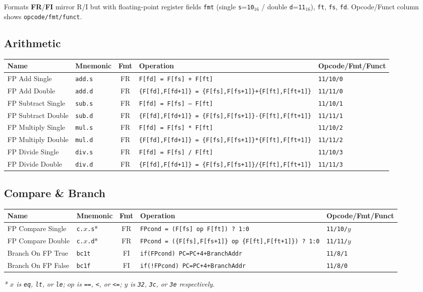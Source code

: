 \documentclass[10pt]{article}
\newcommand{\op}[1]{\texttt{#1}}
\begin{document}
Formats \textbf{FR}/\textbf{FI} mirror R/I but with floating-point register
fields \op{fmt} (single \op{s}=\op{10}$_{16}$ / double \op{d}=\op{11}$_{16}$),
\op{ft}, \op{fs}, \op{fd}. Opcode/Funct column shows \op{opcode/fmt/funct}.

\subsection{Arithmetic}
\begin{center}
\small
\begin{tabular}{@{}p{3.0cm}p{1.3cm}cp{6.4cm}l@{}}
\toprule
Name & Mnemonic & Fmt & Operation & Opcode/Fmt/Funct \\
\midrule
FP Add Single      & \op{add.s} & FR & \op{F[fd] = F[fs] + F[ft]} & \op{11/10/0} \\
FP Add Double       & \op{add.d} & FR & \op{\{F[fd],F[fd+1]\} = \{F[fs],F[fs+1]\}+\{F[ft],F[ft+1]\}} & \op{11/11/0} \\
FP Subtract Single & \op{sub.s} & FR & \op{F[fd] = F[fs] -- F[ft]} & \op{11/10/1} \\
FP Subtract Double  & \op{sub.d} & FR & \op{\{F[fd],F[fd+1]\} = \{F[fs],F[fs+1]\}-\{F[ft],F[ft+1]\}} & \op{11/11/1} \\
FP Multiply Single & \op{mul.s} & FR & \op{F[fd] = F[fs] * F[ft]} & \op{11/10/2} \\
FP Multiply Double  & \op{mul.d} & FR & \op{\{F[fd],F[fd+1]\} = \{F[fs],F[fs+1]\}*\{F[ft],F[ft+1]\}} & \op{11/11/2} \\
FP Divide Single   & \op{div.s} & FR & \op{F[fd] = F[fs] / F[ft]} & \op{11/10/3} \\
FP Divide Double     & \op{div.d} & FR & \op{\{F[fd],F[fd+1]\} = \{F[fs],F[fs+1]\}/\{F[ft],F[ft+1]\}} & \op{11/11/3} \\
\bottomrule
\end{tabular}
\end{center}

\subsection{Compare \& Branch}
\begin{center}
\small
\begin{tabular}{@{}p{3.0cm}p{1.6cm}cp{6.1cm}l@{}}
\toprule
Name & Mnemonic & Fmt & Operation & Opcode/Fmt/Funct \\
\midrule
FP Compare Single & \op{c.$x$.s}* & FR & \op{FPcond = (F[fs] op F[ft]) ? 1:0} & \op{11/10/$y$} \\
FP Compare Double  & \op{c.$x$.d}* & FR & \op{FPcond = (\{F[fs],F[fs{+}1]\} op \{F[ft],F[ft{+}1]\}) ? 1:0} & \op{11/11/$y$} \\
Branch On FP True  & \op{bc1t}  & FI & \op{if(FPcond) PC=PC+4+BranchAddr} & \op{11/8/1} \\
Branch On FP False & \op{bc1f}  & FI & \op{if(!FPcond) PC=PC+4+BranchAddr} & \op{11/8/0} \\
\bottomrule
\end{tabular}
\end{center}
\emph{* $x$ is \op{eq}, \op{lt}, or \op{le}; $op$ is \op{==}, \op{\textless},
or \op{\textless=}; $y$ is \op{32}, \op{3c}, or \op{3e} respectively.}
\end{document}
